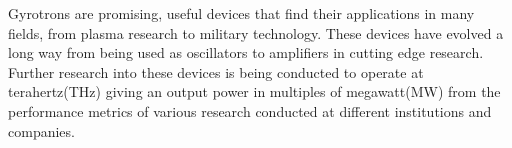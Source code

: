 Gyrotrons are promising, useful devices that find their applications in many fields, from plasma research to military technology. These devices have evolved a long way from being used as oscillators to amplifiers in cutting edge research. Further research into these devices is being conducted to operate at terahertz(THz) giving an output power in multiples of megawatt(MW) from the performance metrics of various research conducted at different institutions and companies.
